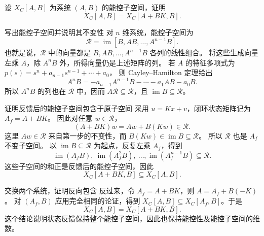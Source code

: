 \documentclass[11pt]{article}
\begin{document}

\begin{problem}[原题 1]
设 $X_C[A,B]$ 为系统 $(A,B)$ 的能控子空间，证明
\[
X_C[A,B]=X_C[A+BK,B].
\]
\end{problem}
\begin{solution}
\begin{proofstep}{写出能控子空间并说明其不变性}
对 $n$ 维系统，能控子空间为
\[
\mathcal R=\operatorname{im}[B,AB,\ldots,A^{n-1}B].
\]
也就是说，$\mathcal R$ 中的向量都是 $B,AB,\ldots,A^{n-1}B$ 各列的线性组合。
将这些生成向量左乘 $A$，除 $A^nB$ 外，所得向量仍是上述矩阵的列。
若 $A$ 的特征多项式为 $p(s)=s^n+a_{n-1}s^{n-1}+\cdots+a_0$，
则 Cayley--Hamilton 定理给出
\[
A^nB=-a_{n-1}A^{n-1}B-\cdots-a_1AB-a_0B.
\]
所以 $A^nB$ 的列也在 $\mathcal R$ 中，因而
$A\mathcal R\subseteq\mathcal R$，且 $\operatorname{im}B\subseteq\mathcal R$。
\end{proofstep}

\begin{proofstep}{证明反馈后的能控子空间包含于原子空间}
采用 $u=Kx+v$，闭环状态矩阵记为 $A_f=A+BK$。
因此对任意 $w\in\mathcal R$，
\[
(A+BK)w=Aw+B(Kw)\in\mathcal R.
\]
这里 $Aw\in\mathcal R$ 来自第一步的不变性，而 $B(Kw)\in\operatorname{im}B\subseteq\mathcal R$。
所以 $\mathcal R$ 也是 $A_f$ 不变子空间。
以 $\operatorname{im}B\subseteq\mathcal R$ 为起点，反复左乘 $A_f$，得到
\[
\operatorname{im}(A_fB),\ \operatorname{im}(A_f^2B),\ \ldots,
\operatorname{im}(A_f^{n-1}B)\subseteq\mathcal R.
\]
这些子空间的和正是反馈后的能控子空间，因此
\[
X_C[A+BK,B]\subseteq X_C[A,B].
\]
\end{proofstep}

\pagebreak
\begin{proofstep}{交换两个系统，证明反向包含}
反过来，令 $A_f=A+BK$，则 $A=A_f+B(-K)$。
对 $(A_f,B)$ 应用完全相同的论证，得到
$X_C[A,B]\subseteq X_C[A_f,B]$。于是
\[
\boxed{X_C[A,B]=X_C[A+BK,B].}
\]
这个结论说明状态反馈保持整个能控子空间，因此也保持能控性及能控子空间的维数。
\end{proofstep}
\end{solution}
\end{document}

